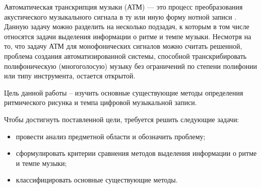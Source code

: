 
Автоматическая транскрипция музыки (АТМ) — это процесс преобразования акустического музыкального сигнала в ту или иную форму нотной записи \cite{future_dir}. Данную задачу можно разделить на несколько подзадач, к которым в том числе относятся задачи выделения информации о ритме и темпе музыки. Несмотря на то, что задачу АТМ для монофонических сигналов можно считать решенной, проблема создания автоматизированной системы, способной транскрибировать полифоническую (многоголосую) музыку без ограничений по степени полифонии или типу инструмента, остается открытой.

Цель данной работы – изучить основные существующие методы определения ритмического рисунка и темпа цифровой музыкальной записи.

Чтобы достигнуть поставленной цели, требуется решить следующие задачи:
\begin{itemize}
	\item провести анализ предметной области и обозначить проблему;
	\item сформулировать критерии сравнения методов выделения информации о ритме и темпе музыки;
	\item классифицировать основные существующие методы.
\end{itemize}